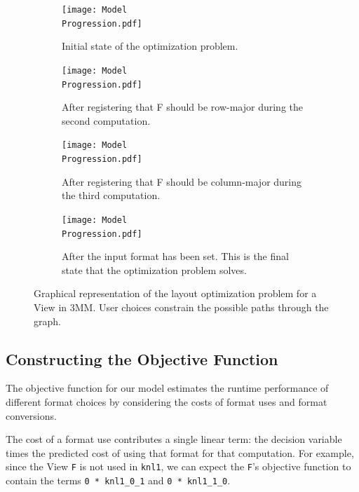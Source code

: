 \documentclass[sigconf,review=true]{acmart}
\begin{document}
\begin{figure}
	
	\begin{subfigure}[t]{0.2\textwidth}
		\texttt{[image: Model\\ Progression.pdf]}
		\caption{Initial state of the optimization problem.}
	\end{subfigure}
	\hspace{0.05\textwidth}
	\begin{subfigure}[t]{0.2\textwidth}
		\texttt{[image: Model\\ Progression.pdf]}
		\caption{After registering that F should be row-major during the second computation.}
	\end{subfigure}

	\begin{subfigure}[t]{0.2\textwidth}
		\texttt{[image: Model\\ Progression.pdf]}
		\caption{After registering that F should be column-major during the third computation.}
	\end{subfigure}
	\hspace{0.05\textwidth}
	\begin{subfigure}[t]{0.2\textwidth}
		\texttt{[image: Model\\ Progression.pdf]}
		\caption{After the input format has been set. This is the final state that the optimization problem solves.}
	\end{subfigure}

	\caption{Graphical representation of the layout optimization problem for a View in 3MM. User choices constrain the possible paths through the graph.}
	\label{graphModel}
\end{figure}

\subsection{Constructing the Objective Function}
The objective function for our model estimates the runtime performance of different format choices by considering the costs of format uses and format conversions.

The cost of a format use contributes a single linear term: the decision variable times the predicted cost of using that format for that computation. 
For example, since the View \verb.F. is not used in \verb.knl1., we can expect the \verb.F.'s objective function to contain the terms \verb.0 * knl1_0_1. and \verb.0 * knl1_1_0..
\end{document}
